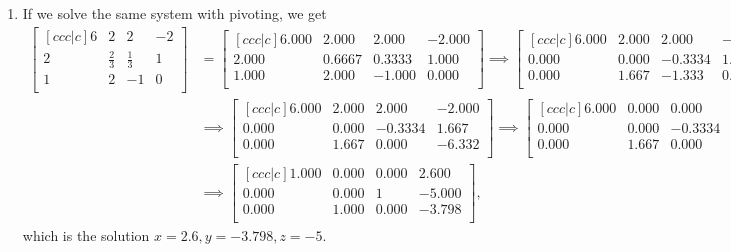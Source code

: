 \documentclass[10pt]{article}
\begin{document}
\begin{enumerate}
\begin{enumerate}
        \item If we solve the same system with pivoting, we get \begin{align*}
            \begin{bmatrix}[ccc|c]
            6 & 2 & 2 & -2 \\
            2 & \frac{2}{3} & \frac{1}{3} & 1 \\
            1 & 2 & -1 & 0 \\
        \end{bmatrix} &= 
        \begin{bmatrix}[ccc|c]
            6.000 & 2.000 & 2.000 & -2.000 \\
            2.000 & 0.6667 & 0.3333 & 1.000 \\
            1.000 & 2.000 & -1.000 & 0.000 \\
        \end{bmatrix} \implies
        \begin{bmatrix}[ccc|c]
            6.000 & 2.000 & 2.000 & -2.000 \\
            0.000 & 0.000 & -0.3334 & 1.667 \\
            0.000 & 1.667 & -1.333 & 0.3333 \\
        \end{bmatrix} \\ &\implies
        \begin{bmatrix}[ccc|c]
            6.000 & 2.000 & 2.000 & -2.000 \\
            0.000 & 0.000 & -0.3334 & 1.667 \\
            0.000 & 1.667 & 0.000 & -6.332 \\
        \end{bmatrix} \implies \begin{bmatrix}[ccc|c]
            6.000 & 0.000 & 0.000 & 15.60 \\
            0.000 & 0.000 & -0.3334 & 1.667 \\
            0.000 & 1.667 & 0.000 & -6.332 \\
        \end{bmatrix} \\ &\implies
        \begin{bmatrix}[ccc|c]
            1.000 & 0.000 & 0.000 & 2.600 \\
            0.000 & 0.000 & 1 & -5.000 \\
            0.000 & 1.000 & 0.000 & -3.798 \\
        \end{bmatrix},
    \end{align*} which is the solution \(x=2.6, y=-3.798, z=-5\).


\end{enumerate}
\end{enumerate}
\end{document}
